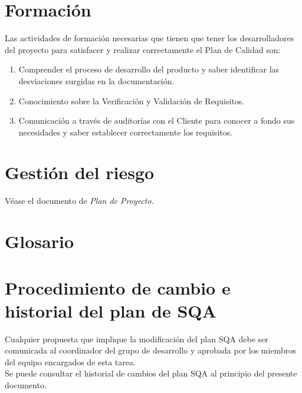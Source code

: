 \documentclass[11pt, a4paper, twoside, titlepage]{article}
\begin{document}
	\section{Formación} %
		Las actividades de formación necesarias que tienen que tener los desarrolladores del proyecto  para satisfacer y realizar correctamente el Plan de Calidad son:

		\begin{enumerate}
			\item Comprender el proceso de desarrollo del producto y saber identificar las desviaciones surgidas en la documentación.
			\item Conocimiento sobre la Verificación y Validación de Requisitos.
			\item Comunicación a través de auditorías con el Cliente para conocer a fondo sus necesidades y saber establecer correctamente
los requisitos.
		\end{enumerate}

		
	\section{Gestión del riesgo}
		Véase el documento de \textit{Plan de Proyecto}.

	\section{Glosario}
		\printglossaries

	\section{Procedimiento de cambio e historial del plan de SQA} %
		Cualquier propuesta que implique la modificación del plan SQA debe ser comunicada al coordinador del grupo de desarrollo y aprobada por los miembros del equipo encargados de esta tarea.\\

		Se puede consultar el historial de cambios del plan SQA al principio del presente documento.

	\appendix
	\newpage
	
	
\end{document}
